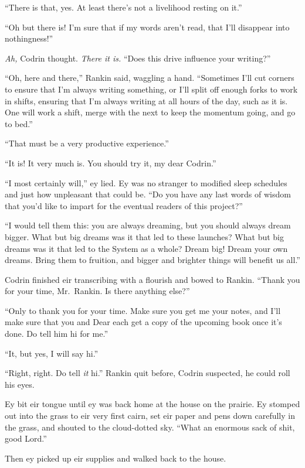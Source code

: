 ``There is that, yes. At least there's not a livelihood resting on it.''

``Oh but there is! I'm sure that if my words aren't read, that I'll disappear into nothingness!''

\emph{Ah,} Codrin thought. \emph{There it is.} ``Does this drive influence your writing?''

``Oh, here and there,'' Rankin said, waggling a hand. ``Sometimes I'll cut corners to ensure that I'm always writing something, or I'll split off enough forks to work in shifts, ensuring that I'm always writing at all hours of the day, such as it is. One will work a shift, merge with the next to keep the momentum going, and go to bed.''

``That must be a very productive experience.''

``It is! It very much is. You should try it, my dear Codrin.''

``I most certainly will,'' ey lied. Ey was no stranger to modified sleep schedules and just how unpleasant that could be. ``Do you have any last words of wisdom that you'd like to impart for the eventual readers of this project?''

``I would tell them this: you are always dreaming, but you should always dream bigger. What but big dreams was it that led to these launches? What but big dreams was it that led to the System as a whole? Dream big! Dream your own dreams. Bring them to fruition, and bigger and brighter things will benefit us all.''

Codrin finished eir transcribing with a flourish and bowed to Rankin. ``Thank you for your time, Mr.~Rankin. Is there anything else?''

``Only to thank you for your time. Make sure you get me your notes, and I'll make sure that you and Dear each get a copy of the upcoming book once it's done. Do tell him hi for me.''

``It, but yes, I will say hi.''

``Right, right. Do tell \emph{it} hi.'' Rankin quit before, Codrin suspected, he could roll his eyes.

Ey bit eir tongue until ey was back home at the house on the prairie. Ey stomped out into the grass to eir very first cairn, set eir paper and pens down carefully in the grass, and shouted to the cloud-dotted sky. ``What an enormous sack of shit, good Lord.''

Then ey picked up eir supplies and walked back to the house.

